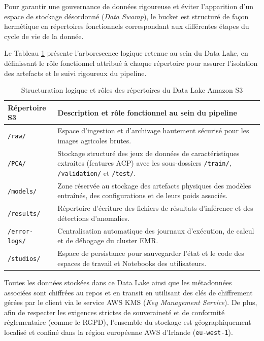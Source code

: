 Pour garantir une gouvernance de données rigoureuse et éviter l'apparition d'un espace de stockage désordonné (\textit{Data Swamp}), le bucket est structuré de façon hermétique en répertoires fonctionnels correspondant aux différentes étapes du cycle de vie de la donnée.

Le Tableau \ref{tab:structuration_s3} présente l'arborescence logique retenue au sein du Data Lake, en définissant le rôle fonctionnel attribué à chaque répertoire pour assurer l'isolation des artefacts et le suivi rigoureux du pipeline.

\begin{table}[H]
\centering
\caption{Structuration logique et rôles des répertoires du Data Lake Amazon S3}
\label{tab:structuration_s3}
\renewcommand{\arraystretch}{1.4}
\begin{tabular}{|l|p{10.5cm}|}
\hline
\rowcolor{darkgreen!20} \textbf{Répertoire S3} & \textbf{Description et rôle fonctionnel au sein du pipeline} \\ \hline
\texttt{/raw/} & Espace d'ingestion et d'archivage hautement sécurisé pour les images agricoles brutes. \\ \hline
\texttt{/PCA/} & Stockage structuré des jeux de données de caractéristiques extraites (features ACP) avec les sous-dossiers \texttt{/train/}, \texttt{/validation/} et \texttt{/test/}. \\ \hline
\texttt{/models/} & Zone réservée au stockage des artefacts physiques des modèles entraînés, des configurations et de leurs poids associés. \\ \hline
\texttt{/results/} & Répertoire d'écriture des fichiers de résultats d'inférence et des détections d'anomalies. \\ \hline
\texttt{/error-logs/} & Centralisation automatique des journaux d'exécution, de calcul et de débogage du cluster EMR. \\ \hline
\texttt{/studios/} & Espace de persistance pour sauvegarder l'état et le code des espaces de travail et Notebooks des utilisateurs. \\ \hline
\end{tabular}
\end{table}

Toutes les données stockées dans ce Data Lake ainsi que les métadonnées associées sont chiffrées au repos et en transit en utilisant des clés de chiffrement gérées par le client via le service AWS KMS (\textit{Key Management Service}). De plus, afin de respecter les exigences strictes de souveraineté et de conformité réglementaire (comme le RGPD), l'ensemble du stockage est géographiquement localisé et confiné dans la région européenne AWS d'Irlande (\texttt{eu-west-1}).



